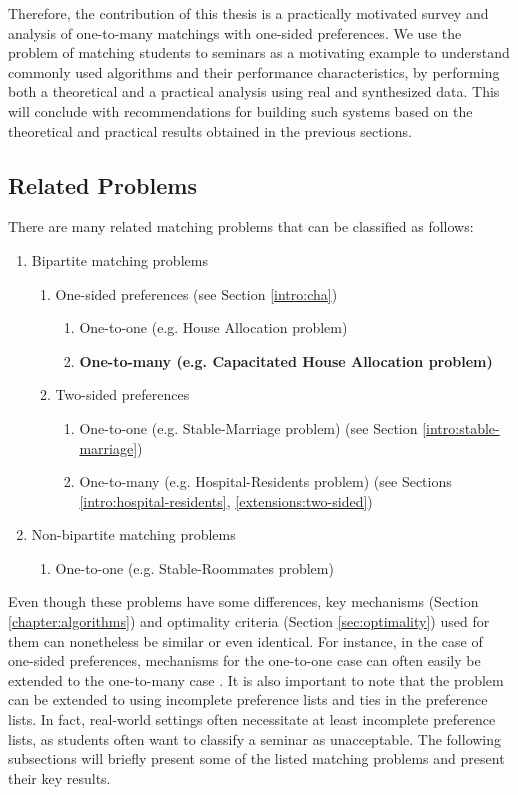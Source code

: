 Therefore, the contribution of this thesis is a practically motivated survey and analysis of one-to-many matchings with one-sided preferences. We use the problem of matching students to seminars as a motivating example to understand commonly used algorithms and their performance characteristics, by performing both a theoretical and a practical analysis using real and synthesized data. This will conclude with recommendations for building such systems based on the theoretical and practical results obtained in the previous sections. 

\subsection{Related Problems}
There are many related matching problems that can be classified as follows:
\begin{enumerate}
    \item Bipartite matching problems
    \begin{enumerate}
        \item One-sided preferences (see Section \ref{intro:cha})
        \begin{enumerate}
            \item One-to-one (e.g. House Allocation problem)
            \item \textbf{One-to-many (e.g. Capacitated House Allocation problem)} 
        \end{enumerate}
        \item Two-sided preferences
        \begin{enumerate}
            \item One-to-one (e.g. Stable-Marriage problem) (see Section \ref{intro:stable-marriage})
            \item One-to-many (e.g. Hospital-Residents problem) (see Sections \ref{intro:hospital-residents}, \ref{extensions:two-sided})
        \end{enumerate}
    \end{enumerate}
    \item Non-bipartite matching problems 
    \begin{enumerate}
        \item One-to-one (e.g. Stable-Roommates problem)
    \end{enumerate}
\end{enumerate}
Even though these problems have some differences, key mechanisms (Section \ref{chapter:algorithms}) and optimality criteria (Section \ref{sec:optimality}) used for them can nonetheless be similar or even identical. For instance, in the case of one-sided preferences, mechanisms for the one-to-one case can often easily be extended to the one-to-many case \cite{Gusfield}. It is also important to note that the problem can be extended to using incomplete preference lists and ties in the preference lists. In fact, real-world settings often necessitate at least incomplete preference lists, as students often want to classify a seminar as unacceptable. The following subsections will briefly present some of the listed matching problems and present their key results.  

